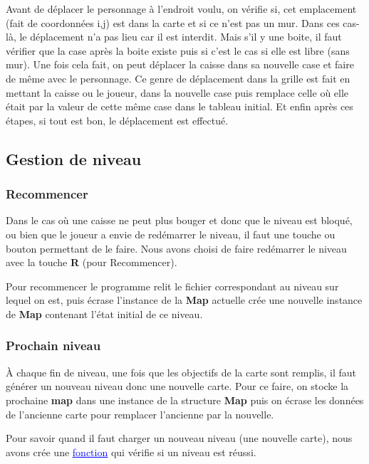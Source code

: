 \documentclass[french, 12pt]{article}
\begin{document}
       Avant de déplacer le personnage à l'endroit voulu, on vérifie si, cet emplacement (fait de coordonnées i,j) est dans la carte et si ce n'est pas un mur. Dans ces cas-là, le déplacement n'a pas lieu car il est interdit. Mais s'il y une boite, il faut vérifier que la case après la boite existe puis si c'est le cas si elle est libre (sans mur). Une fois cela fait, on peut déplacer la caisse dans sa nouvelle case et faire de même avec le personnage. Ce genre de déplacement dans la grille est fait en mettant la caisse ou le joueur, dans la nouvelle case puis remplace celle où elle était par la valeur de cette même case dans le tableau initial.
       Et enfin après ces étapes, si tout est bon, le déplacement est effectué.


   \subsection{Gestion de niveau}
       \subsubsection{Recommencer}
       Dans le cas où une caisse ne peut plus bouger et donc que le niveau est bloqué, ou bien que le joueur a envie de redémarrer le niveau, il faut une touche ou bouton permettant de le faire.
       Nous avons choisi de faire redémarrer le niveau avec la touche \textbf{R} (pour Recommencer).

       Pour recommencer le programme relit le fichier correspondant au niveau sur lequel on est, puis écrase l'instance de la \textbf{Map} actuelle crée une nouvelle instance de \textbf{Map} contenant l'état initial de ce niveau.


       \subsubsection{Prochain niveau}


       À chaque fin de niveau, une fois que les objectifs de la carte sont remplis, il faut générer un nouveau niveau donc une nouvelle carte.
       Pour ce faire, on stocke la prochaine \textbf{map} dans une instance de la structure \textbf{Map} puis on écrase les données de l'ancienne carte pour remplacer l'ancienne par la nouvelle.

       Pour savoir quand il faut charger un nouveau niveau (une nouvelle carte), nous avons crée une \href{../doc/html/move_8h.html}{\textcolor{blue}{\underline{fonction}}} qui vérifie si un niveau est réussi.
\end{document}
